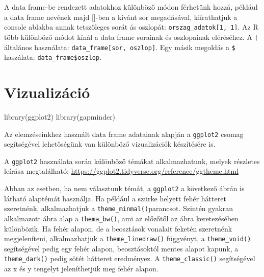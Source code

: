 \documentclass[
]{book}
\newenvironment{Shaded}{\begin{snugshade}}{\end{snugshade}}
\newcommand{\CommentTok}[1]{\textcolor[rgb]{0.56,0.35,0.01}{\textit{#1}}}
\newcommand{\DecValTok}[1]{\textcolor[rgb]{0.00,0.00,0.81}{#1}}
\newcommand{\FunctionTok}[1]{\textcolor[rgb]{0.00,0.00,0.00}{#1}}
\newcommand{\NormalTok}[1]{#1}
\newcommand{\SpecialCharTok}[1]{\textcolor[rgb]{0.00,0.00,0.00}{#1}}
\begin{document}
A data frame-be rendezett adatokhoz különböző módon férhetünk hozzá,
például a data frame nevének majd {[}{]}-ben a kívánt sor megadásával,
kiírathatjuk a console ablakba annak tetszőleges sorát ás oszlopát:
\texttt{orszag\_adatok{[}1,\ 1{]}}. Az R több különböző módot kínál a
data frame sorainak és oszlopainak eléréséhez. A \texttt{{[}} általános
használata: \texttt{data\_frame{[}sor,\ oszlop{]}}. Egy másik megoldás a
\texttt{\$} haszálata: \texttt{data\_frame\$oszlop}.

\begin{Shaded}
\end{Shaded}

\hypertarget{vizualizuxe1ciuxf3}{%
\section{Vizualizáció}\label{vizualizuxe1ciuxf3}}

\begin{Shaded}
\begin{Highlighting}[]
\FunctionTok{library}\NormalTok{(ggplot2)}
\FunctionTok{library}\NormalTok{(gapminder)}
\end{Highlighting}
\end{Shaded}

Az elemzéseinkhez használt data frame adatainak alapján a
\texttt{ggplot2} csomag segítségével lehetőségünk van különböző
vizualizációk készítésére is.

A \texttt{ggplot2} használata során különböző témákat alkalmazhatunk,
melyek részletes leírása megtalálható:
\url{https://ggplot2.tidyverse.org/reference/ggtheme.html}

Abban az esetben, ha nem választunk témát, a \texttt{ggplot2} a
következő ábrán is látható alaptémát használja. Ha például a szürke
helyett fehér hátteret szeretnénk, alkalmazhatjuk a
\texttt{theme\_minmal()}parancsot. Szintén gyakran alkalmazott ábra alap
a \texttt{thema\_bw()}, ami az előzőtől az ábra keretezésében
különbözik. Ha fehér alapon, de a beosztások vonalait feketén szeretnénk
megjeleníteni, alkalmazhatjuk a \texttt{theme\_linedraw()} függvényt, a
\texttt{theme\_void()} segítségével pedig egy fehér alapon,
beosztásoktól mentes alapot kapunk, a \texttt{theme\_dark()} pedig sötét
hátteret eredményez. A \texttt{theme\_classic()} segítségével az x és y
tengelyt jeleníthetjük meg fehér alapon.
\end{document}
